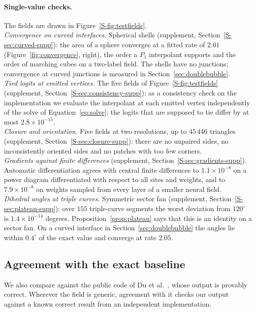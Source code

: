 \documentclass{egpubl}
\newcommand{\sref}[1]{\ref*{S-#1}}
\newcommand{\suppp}[1]{supplement, Section~\sref{#1}}
\theoremstyle{definition}
\begin{document}
\paragraph{Single-value checks.}
The fields are drawn in Figure~\sref{fig:testfields}.\\
\textit{Convergence on curved interfaces.}
Spherical shells (\suppp{sec:curved-supp}): the area of a sphere converges at a
fitted rate of $2.01$ (Figure~\ref{fig:convergence}, right), the order a $P_1$
interpolant supports and the order of marching cubes on a two-label field. The
shells have no junctions; convergence at curved junctions is measured in
Section~\ref{sec:doublebubble}.\\
\textit{Tied logits at emitted vertices.}
The five fields of Figure~\sref{fig:testfields}
(\suppp{sec:consistency-supp}): as a consistency check on the implementation we
evaluate the interpolant at each emitted vertex independently of the solve of
Equation~\eqref{eq:solve}; the logits that are supposed to tie differ by at
most $2.8\times10^{-15}$.\\
\textit{Closure and orientation.}
Five fields at two resolutions, up to $45\,446$ triangles
(\suppp{sec:closure-supp}): there are no unpaired sides, no inconsistently
oriented sides and no patches with too few corners.\\
\textit{Gradients against finite differences} (\suppp{sec:gradients-supp}).
Automatic differentiation agrees with central finite differences to
$1.1\times10^{-8}$ on a power diagram differentiated with respect to all sites
and weights, and to $7.9\times10^{-8}$ on weights sampled from every layer of
a smaller neural field.\\
\textit{Dihedral angles at triple curves.}
Symmetric sector fan (\suppp{sec:plateau-supp}): over $155$ triple-curve
segments the worst deviation from $120^\circ$ is $1.4\times10^{-14}$ degrees.
Proposition~\ref{prop:plateau} says that this is an identity on a sector fan.
On a curved interface in Section~\ref{sec:doublebubble} the angles lie within
$0.4^\circ$ of the exact value and converge at rate $2.05$.

\subsection{Agreement with the exact baseline}
\label{sec:headtohead}

We also compare against the public code of Du et al.~\cite{du2022}, whose
output is provably correct. Wherever the field is generic, agreement with
it checks our output against a known correct result from an independent
implementation.
\end{document}
